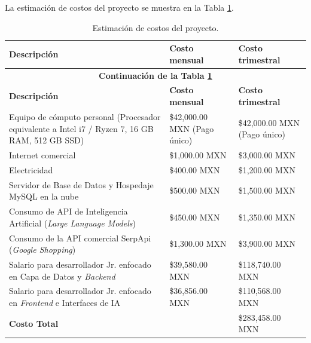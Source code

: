 La estimación de costos del proyecto se muestra en la Tabla \ref{table:tablaCostos}.
{
\begin{longtable}{m{6.5cm} m{4.5cm} m{4cm}}
	\caption{Estimación de costos del proyecto.}
  \label{table:tablaCostos}\\
  \toprule
\textbf{Descripción}&
\textbf{Costo mensual}&
\textbf{Costo trimestral} \\
\hline
\endfirsthead

\multicolumn{3}{c}{\textbf{Continuación de la Tabla \ref{table:tablaCostos}}}\\
\hline
\textbf{Descripción}&
\textbf{Costo mensual}&
\textbf{Costo trimestral} \\
\hline
\endhead
\hline

\endlastfoot

Equipo de cómputo personal (Procesador equivalente a Intel i7 / Ryzen 7, 16 GB RAM, 512 GB SSD)~\cite{CostoLaptop}&
\$42,000.00 MXN (Pago único) &
\$42,000.00 MXN (Pago único)\\
\midrule    

Internet comercial~\cite{CostoInternet}&
\$1,000.00 MXN&
\$3,000.00 MXN\\
\midrule

Electricidad~\cite{CostoLuz}&
\$400.00 MXN&
\$1,200.00 MXN\\
\midrule


Servidor de Base de Datos y Hospedaje MySQL en la nube~\cite{CostoAWS}&
\$500.00 MXN&
\$1,500.00 MXN\\
\midrule

Consumo de API de Inteligencia Artificial (\emph{Large Language Models})~\cite{CostoGroq}&
\$450.00 MXN&
\$1,350.00 MXN\\
\midrule

Consumo de la API comercial SerpApi (\emph{Google Shopping})~\cite{CostoSerpApi}&
\$1,300.00 MXN&
\$3,900.00 MXN\\
\midrule


Salario para desarrollador Jr. enfocado en Capa de Datos y \emph{Backend}~\cite{SalarioBackend}&
\$39,580.00 MXN&
\$118,740.00 MXN\\
\midrule

Salario para desarrollador Jr. enfocado en \emph{Frontend} e Interfaces de IA~\cite{SalarioFrontend}&
\$36,856.00 MXN&
\$110,568.00 MXN\\
\midrule

\textbf{Costo Total}&
   & \$283,458.00 MXN \\

\hline
\bottomrule
\end{longtable}
}